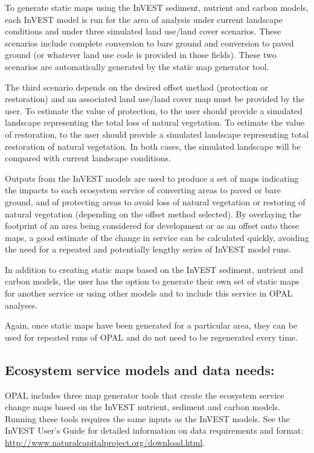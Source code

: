 \documentclass[11pt,letterpaper]{report}
\begin{document}
	To generate static maps using the InVEST sediment, nutrient and carbon models, each InVEST model is run for the area of analysis under current landscape conditions and under three simulated land use/land cover scenarios. These scenarios include complete conversion to bare ground and conversion to paved ground (or whatever land use code is provided in those fields). These two scenarios are automatically generated by the static map generator tool. 
	
	The third scenario depends on the desired offset method (protection or restoration) and an associated land use/land cover map must be provided by the user. To estimate the value of protection, to the user should provide a simulated landscape representing the total loss of natural vegetation. To estimate the value of restoration, to the user should provide a simulated landscape representing total restoration of natural vegetation. In both cases, the simulated landscape will be compared with current landscape conditions.
	
	Outputs from the InVEST models are used to produce a set of maps indicating the impacts to each ecosystem service of converting areas to paved or bare ground, and of protecting areas to avoid loss of natural vegetation or restoring of natural vegetation (depending on the offset method selected). By overlaying the footprint of an area being considered for development or as an offset onto these maps, a good estimate of the change in service can be calculated quickly, avoiding the need for a repeated and potentially lengthy series of InVEST model runs. 
	
	In addition to creating static maps based on the InVEST sediment, nutrient and carbon models, the user has the option to generate their own set of static maps for another service or using other models and to include this service in OPAL analyses.
	
	Again, once static maps have been generated for a particular area, they can be used for repeated runs of OPAL and do not need to be regenerated every time.

	\subsection*{Ecosystem service models and data needs:}

	OPAL includes three  map generator tools that create the ecosystem service change maps based on the InVEST nutrient, sediment and carbon models. Running these tools requires the same inputs as the InVEST models. See the InVEST User's Guide for detailed information on data requirements and format: \url{http://www.naturalcapitalproject.org/download.html}. 
	
\end{document}
